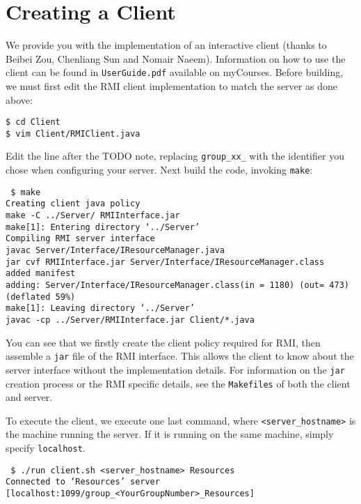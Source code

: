 \documentclass[11pt]{article}
\begin{document}
\section*{Creating a Client}

We provide you with the implementation of an interactive client (thanks to Beibei Zou, Chenliang Sun and Nomair Naeem). Information on how to use the client can be found in \texttt{UserGuide.pdf} available on myCourses. Before building, we must first edit the RMI client implementation to match the server as done above:


\texttt{\$ cd Client\\
\$ vim Client/RMIClient.java}

Edit the line after the TODO note, replacing \texttt{group\_xx\_} with the identifier you chose when configuring your server. Next build the code, invoking \texttt{make}:


\texttt{
\$ make\\
Creating client java policy\\
make -C ../Server/ RMIInterface.jar\\
make[1]: Entering directory `../Server'\\
Compiling RMI server interface\\
javac Server/Interface/IResourceManager.java\\
jar cvf RMIInterface.jar Server/Interface/IResourceManager.class\\
added manifest\\
adding: Server/Interface/IResourceManager.class(in = 1180) (out= 473)(deflated 59\%)\\
make[1]: Leaving directory `../Server'\\
javac -cp ../Server/RMIInterface.jar Client/*.java\\
}

You can see that we firstly create the client policy required for RMI, then assemble a \texttt{jar} file of the RMI interface. This allows the client to know about the server interface without the implementation details. For information on the \texttt{jar} creation process or the RMI specific details, see the \texttt{Makefiles} of both the client and server.

To execute the client, we execute one last command, where \texttt{<server\_hostname>} is the machine running the server. If it is running on the same machine, simply specify \texttt{localhost}.

\texttt{
\$ ./run client.sh <server\_hostname> Resources\\
Connected to `Resources' server [localhost:1099/group\_<YourGroupNumber>\_Resources]
}
\end{document}
